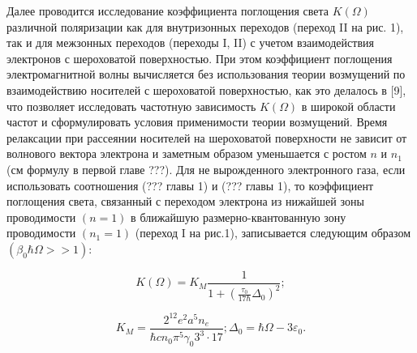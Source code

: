 {Далее проводится исследование коэффициента поглощения света $K\left(\Omega \right)$ различной поляризации как для внутризонных переходов (переход II на рис. 1), так и для межзонных переходов (переходы I, II) с учетом взаимодействия электронов с шероховатой поверхностью. При этом коэффициент поглощения электромагнитной волны вычисляется без использования теории возмущений по взаимодействию носителей с шероховатой поверхностью, как это делалось в \cite{Vurgaftman1999}[9], что позволяет исследовать частотную зависимость $K(\Omega)$ в широкой области частот и сформулировать условия применимости теории возмущений.
Время релаксации при рассеянии носителей на шероховатой поверхности не зависит от волнового вектора электрона и заметным образом уменьшается с ростом $n$ и $n_1$ (см формулу в первой главе ???). Для не вырожденного электронного газа, если использовать соотношения (??? главы 1) и (??? главы 1), то коэффициент поглощения света, связанный с переходом электрона из нижайшей зоны проводимости $(n=1)$ в ближайшую размерно-квантованную зону проводимости $(n_1=1)$ (переход I на рис.1), записывается следующим образом $(\beta _0\hbar \Omega >>1)$:

\begin{equation} \label{eq:21_10}
K \left(\Omega \right)=K_{M} \frac{1}{1+\left(\frac{\tau _{0} }{17\hbar } \Delta _{0} \right)^{2} } ;
\end{equation} 

\[
K_{M} =\frac{2^{12} e^{2} a^{5} n_{e} }{\hbar cn_{0} \pi ^{5} \gamma _{0} 3^{3} \cdot 17} ; \Delta _{0} =\hbar \Omega -3\varepsilon _{0}.
\]

}
